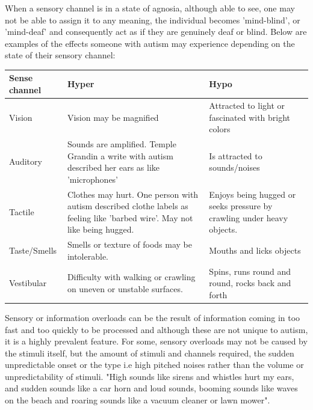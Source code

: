 \documentclass[11pt]{report}
\begin{document}
When a sensory channel is in a state of agnosia, although able to see, one may not be able to assign it to any meaning, the individual becomes 'mind-blind', or 'mind-deaf' and consequently act as if they are genuinely deaf or blind. Below are examples of the effects someone with autism may experience depending on the state of their sensory channel:

\begin{table}[H]
    \begin{tabular}{| l | p{5cm} | p{5cm} |}
    \hline
    Sense channel & Hyper                                                                                                                      & Hypo                                                                   \\
    \hline
    \hline
    Vision        & Vision may be magnified                                                                                                    & Attracted to light or fascinated with bright colors                    \\
    \hline
    Auditory      & Sounds are amplified. Temple Grandin a write with autism described her ears as like 'microphones'                          & Is attracted to sounds/noises                                          \\
    \hline
    Tactile       & Clothes may hurt. One person with autism described clothe labels as feeling like 'barbed wire'. May not like being hugged. & Enjoys being hugged or seeks pressure by crawling under heavy objects. \\
    \hline
    Taste/Smells & Smells or texture of foods may be intolerable. & Mouths and licks objects \\
    \hline
    Vestibular & Difficulty with walking or crawling on uneven or unstable surfaces. & Spins, runs round and round, rocks back and forth \\
    \hline
    \end{tabular}
\end{table}

Sensory or information overloads can be the result of information coming in too fast and too quickly to be processed and although these are not unique to autism, it is a highly prevalent feature. For some, sensory overloads may not be caused by the stimuli itself, but the amount of stimuli and channels required, the sudden unpredictable onset or the type i.e high pitched noises rather than the volume or unpredictability of stimuli. "High sounds like sirens and whistles hurt my ears, and sudden sounds like a car horn and loud sounds, booming sounds like waves on the beach and roaring sounds like a vacuum cleaner or lawn mower". 
\end{document}
